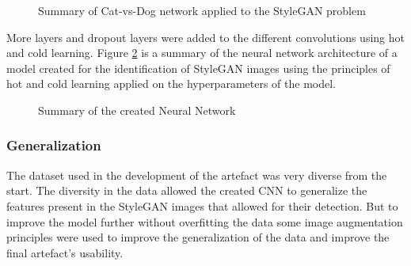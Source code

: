 \begin{figure}[H]%
\centering
{}%
\caption{Summary of Cat-vs-Dog network applied to the StyleGAN problem}%
\label{fig:nn1}%
\end{figure}

More layers and dropout layers were added to the different convolutions using hot and cold learning. Figure \ref{fig:nn2} is a summary of the neural network architecture of a model created for the identification of StyleGAN images using the principles of hot and cold learning applied on the hyperparameters of the model.  

\begin{figure}[H]%
\centering
{}%
\caption{Summary of the created Neural Network}%
\label{fig:nn2}%
\end{figure}

\subsubsection{Generalization}

The dataset used in the development of the artefact was very diverse from the start. The diversity in the data allowed the created CNN to generalize the features present in the StyleGAN images that allowed for their detection. But to improve the model further without overfitting the data some image augmentation principles were used to improve the generalization of the data and improve the final artefact's usability.

